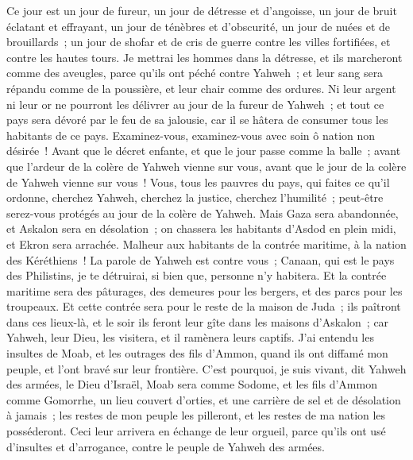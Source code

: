 \begin{multicols}{2}
Ce jour est un jour de fureur, un jour de détresse et d'angoisse, un jour de bruit éclatant et effrayant, un jour de ténèbres et d'obscurité, un jour de nuées et de brouillards~;
un jour de shofar et de cris de guerre contre les villes fortifiées, et contre les hautes tours.
Je mettrai les hommes dans la détresse, et ils marcheront comme des aveugles, parce qu'ils ont péché contre Yahweh~; et leur sang sera répandu comme de la poussière, et leur chair comme des ordures.
Ni leur argent ni leur or ne pourront les délivrer au jour de la fureur de Yahweh~; et tout ce pays sera dévoré par le feu de sa jalousie, car il se hâtera de consumer tous les habitants de ce pays.
\VerseOne{}Examinez-vous, examinez-vous avec soin ô nation non désirée~!
Avant que le décret enfante, et que le jour passe comme la balle~; avant que l'ardeur de la colère de Yahweh vienne sur vous, avant que le jour de la colère de Yahweh vienne sur vous~!
Vous, tous les pauvres du pays, qui faites ce qu'il ordonne, cherchez Yahweh, cherchez la justice, cherchez l'humilité~; peut-être serez-vous protégés au jour de la colère de Yahweh.
Mais Gaza sera abandonnée, et Askalon sera en désolation~; on chassera les habitants d'Asdod en plein midi, et Ekron sera arrachée.
Malheur aux habitants de la contrée maritime, à la nation des Kéréthiens~! La parole de Yahweh est contre vous~; Canaan, qui est le pays des Philistins, je te détruirai, si bien que, personne n'y habitera.
Et la contrée maritime sera des pâturages, des demeures pour les bergers, et des parcs pour les troupeaux.
Et cette contrée sera pour le reste de la maison de Juda~; ils paîtront dans ces lieux-là, et le soir ils feront leur gîte dans les maisons d'Askalon~; car Yahweh, leur Dieu, les visitera, et il ramènera leurs captifs.
J'ai entendu les insultes de Moab, et les outrages des fils d'Ammon, quand ils ont diffamé mon peuple, et l'ont bravé sur leur frontière.
C'est pourquoi, je suis vivant, dit Yahweh des armées, le Dieu d'Israël, Moab sera comme Sodome, et les fils d'Ammon comme Gomorrhe, un lieu couvert d'orties, et une carrière de sel et de désolation à jamais~; les restes de mon peuple les pilleront, et les restes de ma nation les posséderont.
Ceci leur arrivera en échange de leur orgueil, parce qu'ils ont usé d'insultes et d'arrogance, contre le peuple de Yahweh des armées.

\end{multicols}
